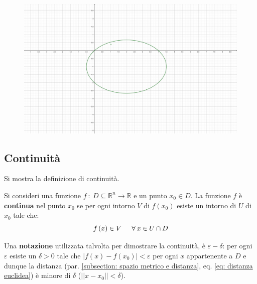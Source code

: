 \documentclass[a4paper]{article}
\newcommand{\definition}[1]{\textcolor{Red3}{\textbf{#1}}}
\begin{document}
	\begin{figure}[!htp]
		\centering
		\includegraphics[width=.9\textwidth]{img/curve_di_livello-3.pdf}
	\end{figure}\newpage

	\subsection{Continuità}\label{subsection: continuità}

	Si mostra la definizione di continuità.

	\begin{boxdef}
		Si consideri una funzione $f \: : \: D \subseteq \mathbb{R}^{n} \rightarrow \mathbb{R}$ e un punto $x_{0} \in D$. La funzione $f$ è \definition{continua} nel punto $x_{0}$ se per ogni intorno $V$ di $f\left(x_{0}\right)$ esiste un intorno di $U$ di $x_{0}$ tale che:
		\begin{equation*}
			f\left(x\right) \in V \hspace{1.5em} \forall \: x \in U \cap D
		\end{equation*}
	\end{boxdef}

	\noindent
	Una \definition{notazione} utilizzata talvolta per dimostrare la continuità, è $\varepsilon - \delta$: per ogni $\varepsilon$ esiste un $\delta > 0$ tale che $\left| f\left(x\right) - f\left(x_{0}\right) \right| < \varepsilon$ per ogni $x$ appartenente a $D$ e dunque la distanza (par. \ref{subsection: spazio metrico e distanza}, eq. \ref{eq: distanza euclidea}) è minore di $\delta$ ($\left|\left| x - x_{0} \right|\right| < \delta$).\newline
\end{document}

